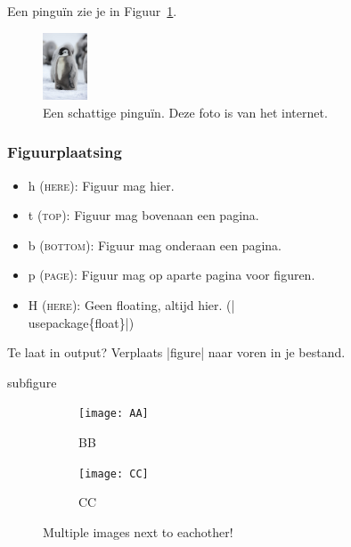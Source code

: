 \documentclass[presentatie.tex]{subfiles}
\begin{document}
\begin{frame}{}
	\vspace{-28px}
	
	\begin{penExResult}[3cm]
		Een pinguïn zie je in Figuur~\ref{fig:pinguin}.
		\begin{figure}[h]
			\centering
			\includegraphics[height=2cm]{assets/pinguin.jpg}
			\caption{Een schattige pinguïn. Deze foto is van het internet.}\label{fig:pinguin}
		\end{figure}
	\end{penExResult}
\end{frame}


\begin{frame}
	\frametitle{Figuurplaatsing}

	
	\begin{itemize}
		\item h \textsc{(here)}: Figuur mag hier.
		\item t \textsc{(top)}: Figuur mag bovenaan een pagina.
		\item b \textsc{(bottom)}: Figuur mag onderaan een pagina.
		\item p \textsc{(page)}: Figuur mag op aparte pagina voor figuren.
		\item H \textsc{(here)}: Geen floating, altijd hier. (\hll|\\usepackage\{float\}|)
	\end{itemize}

	\medskip
	Te laat in output? Verplaats \hll|figure| naar voren in je bestand.
\end{frame}

\begin{saveblock}{subfigure}
	\begin{highlightblock}[linewidth=0.95\textwidth,framexleftmargin=0.25em]
		\begin{figure}[htbp]
			\centering
			\begin{subfigure}[b]{0.45\textwidth}
				\texttt{[image: AA]}
				\caption{BB}
				\label{fig:dphiExample}
			\end{subfigure}\qquad
			\begin{subfigure}[b]{0.45\textwidth}
				\texttt{[image: CC]}
				\caption{CC}
				\label{fig:fitExample}
			\end{subfigure}
			\caption{Multiple images next to eachother!}
		\end{figure}
	\end{highlightblock}
\end{saveblock}
\end{document}
